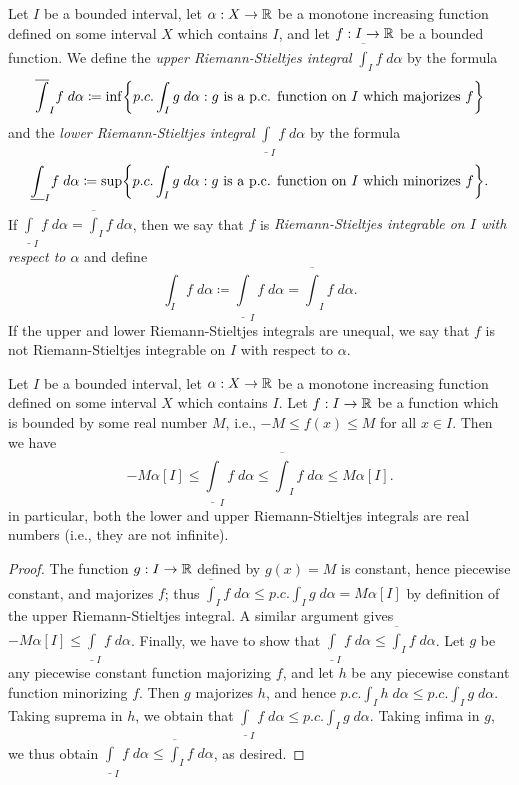\begin{ac}\label{i:ac:11.8.8}
  Let \(I\) be a bounded interval, let \(\alpha : X \to \mathbb{R}\) be a monotone increasing function defined on some interval \(X\) which contains \(I\), and let \(f : I \to \mathbb{R}\) be a bounded function.
  We define the \emph{upper Riemann-Stieltjes integral} \(\overline{\int}_I f \; d \alpha\) by the formula
  \[
    \overline{\int}_I f \; d \alpha \coloneqq \inf\set{p.c. \int_I g \; d \alpha : g \text{ is a p.c. function on \(I\) which majorizes } f}
  \]
  and the \emph{lower Riemann-Stieltjes integral} \(\underline{\int}_I f \; d \alpha\) by the formula
  \[
    \underline{\int}_I f \; d \alpha \coloneqq \sup\set{p.c. \int_I g \; d \alpha : g \text{ is a p.c. function on \(I\) which minorizes } f}.
  \]
  If \(\underline{\int}_I f \; d \alpha = \overline{\int}_I f \; d \alpha\), then we say that \(f\) is \emph{Riemann-Stieltjes integrable on \(I\) with respect to \(\alpha\)} and define
  \[
    \int_I f \; d \alpha \coloneqq \underline{\int}_I f \; d \alpha = \overline{\int}_I f \; d \alpha.
  \]
  If the upper and lower Riemann-Stieltjes integrals are unequal, we say that \(f\) is not Riemann-Stieltjes integrable on \(I\) with respect to \(\alpha\).
\end{ac}

\begin{ac}\label{i:ac:11.8.9}
  Let \(I\) be a bounded interval, let \(\alpha : X \to \mathbb{R}\) be a monotone increasing function defined on some interval \(X\) which contains \(I\).
  Let \(f : I \to \mathbb{R}\) be a function which is bounded by some real number \(M\), i.e., \(-M \leq f(x) \leq M\) for all \(x \in I\).
  Then we have
  \[
    -M \alpha[I] \leq \underline{\int}_I f \; d \alpha \leq \overline{\int}_I f \; d \alpha \leq M \alpha[I].
  \]
  in particular, both the lower and upper Riemann-Stieltjes integrals are real numbers (i.e., they are not infinite).
\end{ac}

\begin{proof}
  The function \(g : I \to \mathbb{R}\) defined by \(g(x) = M\) is constant, hence piecewise constant, and majorizes \(f\);
  thus \(\overline{\int}_I f \; d \alpha \leq p.c. \int_I g \; d \alpha = M \alpha[I]\) by definition of the upper Riemann-Stieltjes integral.
  A similar argument gives \(-M \alpha[I] \leq \underline{\int}_I f \; d \alpha\).
  Finally, we have to show that \(\underline{\int}_I f \; d \alpha \leq \overline{\int}_I f \; d \alpha\).
  Let \(g\) be any piecewise constant function majorizing \(f\), and let \(h\) be any piecewise constant function minorizing \(f\).
  Then \(g\) majorizes \(h\), and hence \(p.c. \int_I h \; d \alpha \leq p.c. \int_I g \; d \alpha\).
  Taking suprema in \(h\), we obtain that \(\underline{\int}_I f \; d \alpha \leq p.c. \int_I g \; d \alpha\).
  Taking infima in \(g\), we thus obtain \(\underline{\int}_I f \; d \alpha \leq \overline{\int}_I f \; d \alpha\), as desired.
\end{proof}

